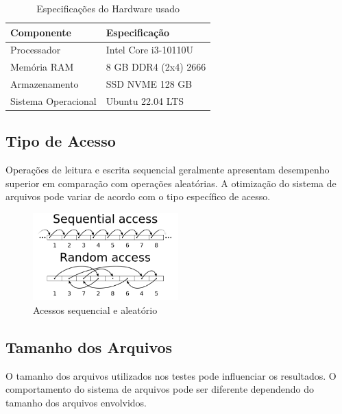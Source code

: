 \documentclass[
	12pt,				%
	openright,			%
	oneside,			%
	a4paper,			%
	chapter=TITLE,		%
	english,			%
	french,				%
	spanish,			%
	brazil				%
	]{abntex2}
\theoremstyle{definition}
\begin{document}
\begin{table}[ht]
    \centering
    \caption{Especificações do Hardware usado}
    \begin{tabular}{@{}ll@{}}
        \toprule
        \textbf{Componente} & \textbf{Especificação} \\
        \midrule
        Processador & Intel Core i3-10110U \\
        Memória RAM & 8 GB DDR4 (2x4) 2666 \\
        Armazenamento & SSD NVME 128 GB \\
        Sistema Operacional & Ubuntu 22.04 LTS \\
        \bottomrule
    \end{tabular}
    \label{tab:ideapad_specs}
\end{table}
\subsection{Tipo de Acesso}

Operações de leitura e escrita sequencial geralmente apresentam desempenho superior 
em comparação com operações aleatórias. A otimização do sistema de arquivos 
pode variar de acordo com o tipo específico de acesso.

\begin{figure}[H]
	\centering
	\includegraphics[width=0.5\textwidth]{RandomVsSeq.png}
	\caption{Acessos sequencial e aleatório}
\end{figure}

\subsection{Tamanho dos Arquivos}

O tamanho dos arquivos utilizados nos testes pode influenciar os resultados. 
O comportamento do sistema de arquivos pode ser diferente dependendo do 
tamanho dos arquivos envolvidos.

\end{document}
